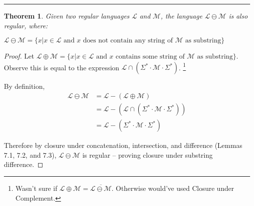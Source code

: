 \documentclass[11pt]{report}
\theoremstyle{definition}
\theoremstyle{plain}
\theoremstyle{plain}
\newtheorem{theorem*}{Theorem}
\begin{document}
\hrule

\begin{theorem*}
Given two regular languages $\mathcal{L}$ and $\mathcal{M}$, 
the language $\mathcal{L} \ominus \mathcal{M}$ is also regular, where:
\begin{center}
$\mathcal{L} \ominus \mathcal{M} = \{ x|x \in \mathcal{L} \text{ and } x \text{ does not contain any string of } \mathcal{M} \text{ as substring}\}$
\end{center}

\end{theorem*}

\begin{proof}
Let $\mathcal{L} \oplus \mathcal{M} = \{ x|x \in \mathcal{L} \text{ and } x \text{ contains some string of } \mathcal{M} \text{ as substring}\}$. Observe this is equal to the expression 
$\mathcal{L} \cap (\Sigma^{*} \cdot \mathcal{M} \cdot \Sigma^{*})$.
\footnote{Wasn't sure if $\mathcal{L} \oplus \mathcal{M} = \overline{\mathcal{L} \ominus \mathcal{M}}$. Otherwise would've used Closure under Complement.} \newline

\noindent By definition,
\begin{align*}
\mathcal{L} \ominus \mathcal{M} &= \mathcal{L} - (\mathcal{L} \oplus \mathcal{M}) \\
&= \mathcal{L} - (\mathcal{L} \cap (\Sigma^{*} \cdot \mathcal{M} \cdot \Sigma^{*})) \\
&= \mathcal{L} - (\Sigma^{*} \cdot \mathcal{M} \cdot \Sigma^{*})
\end{align*}

\noindent Therefore by closure under concatenation, intersection, and difference (Lemmas 7.1, 7.2, and 7.3),
$\mathcal{L} \ominus \mathcal{M}$ is regular -- proving closure under substring difference.
\end{proof}
\end{document}
